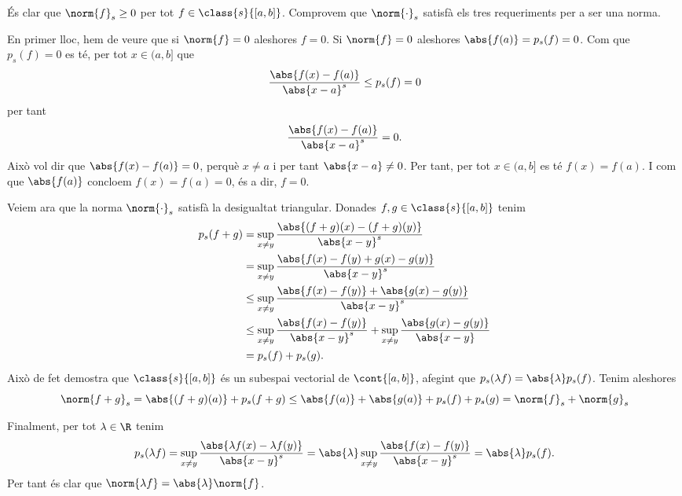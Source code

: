 \documentclass[12pt]{article}
\begin{document}
És clar que \( \norm{f}_s \geq 0 \) per tot \( f \in \class{s}{[a,b]} \). Comprovem que \(
\norm{\cdot}_s \) satisfà els tres requeriments per a ser una norma.

En primer lloc, hem de veure que si \( \norm{f} = 0 \) aleshores \( f = 0 \). Si \(
\norm{f} = 0 \) aleshores \( \abs{f(a)} = p_s(f) = 0 \). Com que \( p_s(f) = 0 \) es té,
per tot \( x \in (a,b] \) que
\begin{equation*}
	\frac{\abs{f(x) - f(a)}}{\abs{x - a}^s} \leq p_s(f) = 0
\end{equation*}
per tant
\begin{equation*}
	\frac{\abs{f(x) - f(a)}}{\abs{x - a}^s} = 0.
\end{equation*}
Això vol dir que \( \abs{f(x) - f(a)} = 0 \), perquè \( x \neq a \) i per tant \( \abs{x -
a} \neq 0 \). Per tant, per tot \( x \in (a,b] \) es té \( f(x) = f(a) \). I com que \(
\abs{f(a)} \) concloem \( f(x) = f(a) = 0 \), és a dir, \( f = 0 \).

Veiem ara que la norma \( \norm{\cdot}_s \) satisfà la desigualtat triangular. Donades \(
f, g \in \class{s}{[a,b]} \) tenim
\begin{align*}
	p_s(f + g) & = \sup_{x \neq y} \frac{\abs{(f+g)(x) - (f+g)(y)}}{\abs{x-y}^s} \\
						 & = \sup_{x \neq y} \frac{\abs{f(x) - f(y) + g(x) - g(y)}}{\abs{x-y}^s} \\
						 & \leq \sup_{x \neq y} \frac{\abs{f(x) - f(y)} + \abs{g(x) - g(y)}}{\abs{x-y}^s} \\
						 & \leq \sup_{x \neq y} \frac{\abs{f(x) - f(y)}}{\abs{x-y}^s} + \sup_{x \neq
					 y} \frac{\abs{g(x) - g(y)}}{\abs{x-y}} \\
					 	 & = p_s(f) + p_s(g).
\end{align*}
Això de fet demostra que \( \class{s}{[a,b]} \) és un subespai vectorial de \(
\cont{[a,b]} \), afegint que \( p_s(\lambda f) = \abs{\lambda}p_s(f) \). Tenim aleshores
\begin{equation*}
	\norm{f+g}_s = \abs{(f+g)(a)} + p_s(f+g) \leq \abs{f(a)} + \abs{g(a)} + p_s(f) + p_s(g)
	= \norm{f}_s + \norm{g}_s
\end{equation*}

Finalment, per tot \( \lambda \in \R \) tenim
\begin{equation*}
	p_s(\lambda f) = \sup_{x \neq y} \frac{\abs{\lambda f(x) - \lambda f(y)}}{\abs{x - y}^s}
	= \abs{\lambda}\sup_{x \neq y} \frac{\abs{ f(x) -  f(y)}}{\abs{x - y}^s} =
	\abs{\lambda}p_s(f).
\end{equation*}
Per tant és clar que \( \norm{\lambda f} = \abs{\lambda}\norm{f} \).
\end{document}
